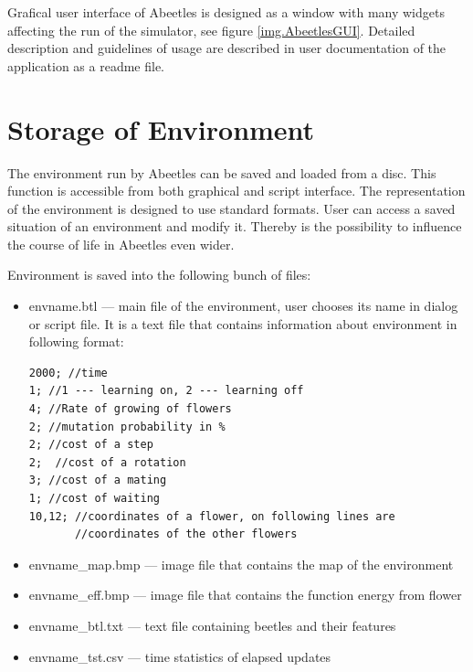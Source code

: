 \documentclass[a4paper,12pt]{report}
\begin{document}
Grafical user interface of Abeetles is designed as a window with many widgets affecting the run of the simulator, see figure \ref{img.AbeetlesGUI}. Detailed description and guidelines of usage are described in user documentation of the application as a readme file.

\section{Storage of Environment}

The environment run by Abeetles can be saved and loaded from a disc. This function is accessible from both graphical and script interface. The representation of the environment is designed to use standard formats. User can access a saved situation of an environment and modify it. Thereby is the possibility to influence the course of life in Abeetles even wider.

Environment is saved into the following bunch of files:
\begin{itemize}
\item envname.btl --- main file of the environment, user chooses its name in dialog or script file. It is a text file that contains information about environment in following format:
\begin{verbatim}
2000; //time
1; //1 --- learning on, 2 --- learning off
4; //Rate of growing of flowers
2; //mutation probability in %
2; //cost of a step
2;  //cost of a rotation
3; //cost of a mating
1; //cost of waiting
10,12; //coordinates of a flower, on following lines are 
       //coordinates of the other flowers 
\end{verbatim}
\item envname\_map.bmp --- image file that contains the map of the environment
\item envname\_eff.bmp --- image file that contains the function energy from flower 
\item envname\_btl.txt --- text file containing beetles and their features 
\item envname\_tst.csv --- time statistics of elapsed updates
\end{itemize}  
\end{document}
